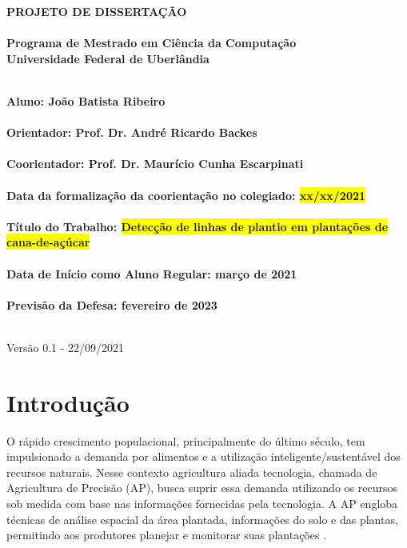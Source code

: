 \documentclass[12pt, a4paper, english, brazil]{article}
\newcommand{\textRed}[1]{{{\color{red} #1}}}
\begin{document}
\rhead{\thepage}

\begin{center}
	\bf{\LARGE{PROJETO DE DISSERTAÇÃO}\\ $\ $\\}
	\Large{Programa de Mestrado em Ciência da Computação\\
		Universidade Federal de Uberlândia}\\ $\ $\\
\end{center}

\begin{center}
	\bf{Aluno: João Batista Ribeiro\\ $\ $\\
		Orientador: Prof. Dr. André Ricardo Backes\\ $\ $\\
		Coorientador: Prof. Dr. Maurício Cunha Escarpinati\\ $\ $\\
		Data da formalização da coorientação no colegiado: \colorbox{yellow}{xx/xx/2021}\\ $\ $\\
		Título do Trabalho: \colorbox{yellow}{Detecção de linhas de plantio em plantações de cana-de-açúcar}\\ $\ $\\
		Data de Início como Aluno Regular: março de 2021\\ $\ $\\
		Previsão da Defesa: fevereiro de 2023\\ $\ $\\}
\end{center}

\textRed{Versão 0.1 - 22/09/2021}

\section{Introdução}

O rápido crescimento populacional, principalmente do último século, tem impulsionado a demanda por alimentos e a utilização inteligente/sustentável dos recursos naturais. Nesse contexto agricultura aliada tecnologia, chamada de Agricultura de Precisão (AP), busca suprir essa demanda utilizando os recursos sob medida com base nas informações fornecidas pela tecnologia. A AP engloba técnicas de análise espacial da área plantada, informações do solo e das plantas, permitindo aos produtores planejar e monitorar suas plantações \cite{Blasch_2020}.
\end{document}
